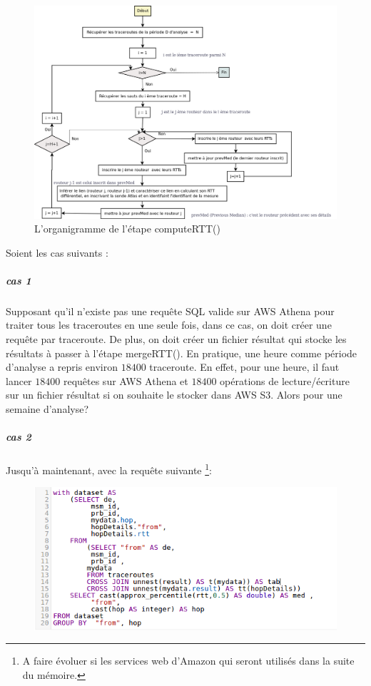 \begin{figure}[H]
\centering
\includegraphics[width=1\linewidth]{illustrations/organigram-rttAnalysis}
\caption{ L'organigramme de  l'étape computeRTT()}
\label{fig:organigram-rttAnalysis}
\end{figure}

Soient les cas suivants :
\subparagraph{cas 1}

Supposant qu'il n'existe pas une requête SQL valide sur AWS Athena pour traiter tous les traceroutes en une seule fois, dans  ce cas, on doit créer une requête par traceroute. De plus, on doit créer un fichier résultat qui stocke les résultats à passer à l'étape mergeRTT(). En pratique, une heure comme période d'analyse a repris environ $ 18400 $ traceroute. En effet, pour une heure, il faut lancer $ 18400 $ requêtes sur AWS Athena et $ 18400 $ opérations de lecture/écriture sur un fichier résultat si on souhaite le stocker dans AWS S3. Alors pour une semaine d'analyse? 


\subparagraph{cas 2}

Jusqu'à maintenant, avec la requête suivante \footnote{A faire évoluer si les services web d'Amazon qui seront utilisés dans la suite du mémoire.}:


\begin{figure}[H]
\centering
\includegraphics[width=1\linewidth]{illustrations/request}
\caption{}
\label{fig:request}
\end{figure}


